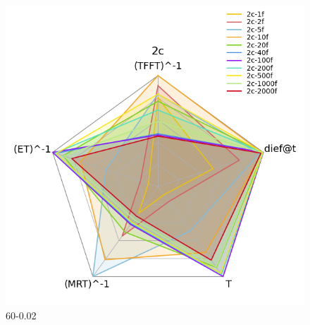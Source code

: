 \documentclass[12pt,a4paper]{article}
\begin{document}
\begin{figure}[H]
{\begin{minipage}{0.5\textwidth}
            \includegraphics[scale=0.6]{../processed/NRT/small/checks/60-0.02/fixedcores/2c/plots/radar-dieft.png}
            \caption*{60-0.02}
        \end{minipage}
    }
    
    \vspace{0.5cm} %



\end{figure}
\end{document}
